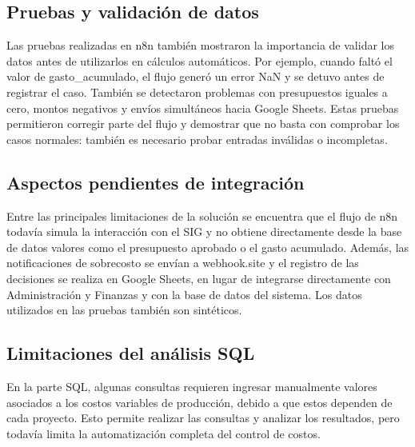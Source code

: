 \documentclass[11pt,letterpaper]{article}
\begin{document}
\subsection{Pruebas y validación de datos}

Las pruebas realizadas en n8n también mostraron la importancia de validar los datos antes de utilizarlos en cálculos automáticos. Por ejemplo, cuando faltó el valor de gasto\_acumulado, el flujo generó un error NaN y se detuvo antes de registrar el caso. También se detectaron problemas con presupuestos iguales a cero, montos negativos y envíos simultáneos hacia Google Sheets. Estas pruebas permitieron corregir parte del flujo y demostrar que no basta con comprobar los casos normales: también es necesario probar entradas inválidas o incompletas.


\subsection{Aspectos pendientes de integración}

Entre las principales limitaciones de la solución se encuentra que el flujo de n8n todavía simula la interacción con el SIG y no obtiene directamente desde la base de datos valores como el presupuesto aprobado o el gasto acumulado. Además, las notificaciones de sobrecosto se envían a webhook.site y el registro de las decisiones se realiza en Google Sheets, en lugar de integrarse directamente con Administración y Finanzas y con la base de datos del sistema. Los datos utilizados en las pruebas también son sintéticos.


\subsection{Limitaciones del análisis SQL}

En la parte SQL, algunas consultas requieren ingresar manualmente valores asociados a los costos variables de producción, debido a que estos dependen de cada proyecto. Esto permite realizar las consultas y analizar los resultados, pero todavía limita la automatización completa del control de costos.
\end{document}
